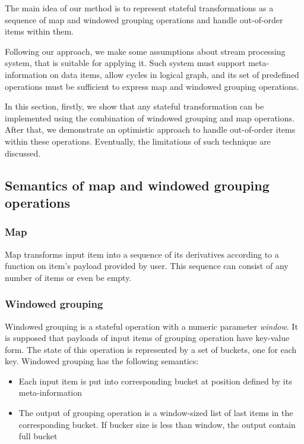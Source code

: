 
\label {fs-optimistic}

The main idea of our method is to represent stateful transformations as a sequence of map and windowed grouping operations and handle out-of-order items within them. 

Following our approach, we make some assumptions about stream processing system, that is suitable for applying it. Such system must support meta-information on data items, allow cycles in logical graph, and its set of predefined operations must be sufficient to express map and windowed grouping operations.

In this section, firstly, we show that any stateful transformation can be implemented using the combination of windowed grouping and map operations. After that, we demonstrate an optimistic approach to handle out-of-order items within these operations. Eventually, the limitations of such technique are discussed.

\subsection{Semantics of map and windowed grouping operations}

\subsubsection{Map}
Map transforms input item into a sequence of its derivatives according to a function on item's payload provided by user. This sequence can consist of any number of items or even be empty.

\subsubsection{Windowed grouping}
Windowed grouping is a stateful operation with a numeric parameter {\it window}. It is supposed that payloads of input items of grouping operation have key-value form. The state of this operation is represented by a set of buckets, one for each key. Windowed grouping has the following semantics:

\begin{itemize}
    \item Each input item is put into corresponding bucket at position defined by its meta-information
    \item The output of grouping operation is a window-sized list of last items in the corresponding bucket. If bucker size is less than window, the output contain full bucket
\end{itemize}

